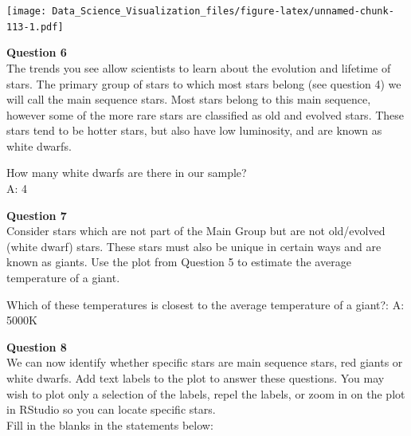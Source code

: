 \documentclass[
]{article}
\newenvironment{Shaded}{\begin{snugshade}}{\end{snugshade}}
\newcommand{\DataTypeTok}[1]{\textcolor[rgb]{0.13,0.29,0.53}{#1}}
\newcommand{\KeywordTok}[1]{\textcolor[rgb]{0.13,0.29,0.53}{\textbf{#1}}}
\newcommand{\NormalTok}[1]{#1}
\newcommand{\OperatorTok}[1]{\textcolor[rgb]{0.81,0.36,0.00}{\textbf{#1}}}
\newcommand{\StringTok}[1]{\textcolor[rgb]{0.31,0.60,0.02}{#1}}
\begin{document}
\begin{Shaded}
\end{Shaded}

\texttt{[image: Data\_Science\_Visualization\_files/figure-latex/unnamed-chunk-113-1.pdf]}

\textbf{Question 6}\\
The trends you see allow scientists to learn about the evolution and
lifetime of stars. The primary group of stars to which most stars belong
(see question 4) we will call the main sequence stars. Most stars belong
to this main sequence, however some of the more rare stars are
classified as old and evolved stars. These stars tend to be hotter
stars, but also have low luminosity, and are known as white dwarfs.

How many white dwarfs are there in our sample?\\
A: 4

\textbf{Question 7}\\
Consider stars which are not part of the Main Group but are not
old/evolved (white dwarf) stars. These stars must also be unique in
certain ways and are known as giants. Use the plot from Question 5 to
estimate the average temperature of a giant.

Which of these temperatures is closest to the average temperature of a
giant?: A: 5000K

\textbf{Question 8}\\
We can now identify whether specific stars are main sequence stars, red
giants or white dwarfs. Add text labels to the plot to answer these
questions. You may wish to plot only a selection of the labels, repel
the labels, or zoom in on the plot in RStudio so you can locate specific
stars.\\
Fill in the blanks in the statements below:
\end{document}
